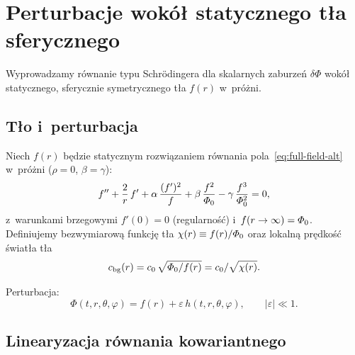 \section{Perturbacje wok\'o\l{} statycznego t\l{}a sferycznego}%
\label{app:ringdown}

Wyprowadzamy r\'ownanie typu Schr\"odingera dla skalarnych
zaburze\'n $\delta\Phi$ wok\'o\l{} statycznego, sferycznie
symetrycznego t\l{}a $f(r)$ w~pr\'o\.zni.

\subsection{T\l{}o i~perturbacja}

Niech $f(r)$ b\k{e}dzie statycznym rozwi\k{a}zaniem r\'ownania
pola~\eqref{eq:full-field-alt} w~pr\'o\.zni ($\rho = 0$, $\beta = \gamma$):
\begin{equation}\label{eq:bg-static}
  f'' + \frac{2}{r}\,f' + \alpha\,\frac{(f')^2}{f}
  + \beta\,\frac{f^2}{\varPhi_0} - \gamma\,\frac{f^3}{\varPhi_0^2} = 0,
\end{equation}
z~warunkami brzegowymi $f'(0) = 0$ (regularno\'s\'c)
i~$f(r \to \infty) = \varPhi_0$.
Definiujemy bezwymiarow\k{a} funkcj\k{e} t\l{}a
$\chi(r) \equiv f(r)/\varPhi_0$ oraz lokaln\k{a} pr\k{e}dko\'s\'c
\'swiat\l{}a t\l{}a
\begin{equation}
  c_{\mathrm{bg}}(r) = c_0\,\sqrt{\varPhi_0/f(r)}
  = c_0/\sqrt{\chi(r)}.
\end{equation}

Perturbacja:
\begin{equation}
  \Phi(t, r, \theta, \varphi)
  = f(r) + \varepsilon\,h(t, r, \theta, \varphi),
  \qquad |\varepsilon| \ll 1.
\end{equation}

\subsection{Linearyzacja r\'ownania kowariantnego}

